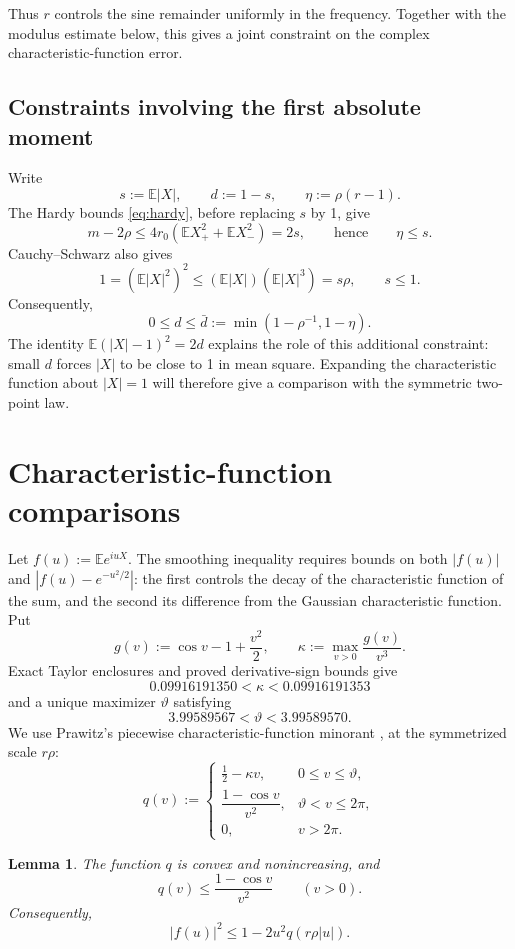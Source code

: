 \documentclass[11pt]{article}
\newtheorem{lemma}[theorem]{Lemma}
\newcommand{\E}{\mathbb E}
\newcommand{\abs}[1]{\lvert#1\rvert}
\begin{document}
Thus \(r\) controls the sine remainder uniformly in the frequency.  Together
with the modulus estimate below, this gives a joint constraint on the complex
characteristic-function error.

\subsection{Constraints involving the first absolute moment}\label{sec:radial-defect}

Write
\[
 s:=\E|X|,\qquad d:=1-s,\qquad \eta:=\rho(r-1).
\]
The Hardy bounds \eqref{eq:hardy}, before replacing \(s\) by 1, give
\[
 m-2\rho\le4r_0(\E X_+^2+\E X_-^2)=2s,
 \qquad\text{hence}\qquad \eta\le s.
\]
Cauchy--Schwarz also gives
\[
 1=(\E|X|^2)^2\le(\E|X|)(\E|X|^3)=s\rho,\qquad s\le1.
\]
Consequently,
\[
 0\le d\le\bar d:=\min(1-\rho^{-1},1-\eta).
 \label{eq:defect}\tag{2.6}
\]
The identity \(\E(|X|-1)^2=2d\) explains the role of this additional
constraint: small \(d\) forces \(|X|\) to be close to 1 in mean square.
Expanding the characteristic function about \(|X|=1\) will therefore
give a comparison with the symmetric two-point law.

\section{Characteristic-function comparisons}\label{sec:cf-bounds}

Let \(f(u):=\E e^{iuX}\). The smoothing inequality requires bounds on
both \(|f(u)|\) and \(|f(u)-e^{-u^2/2}|\): the first controls the
decay of the characteristic function of the sum, and the second its
difference from the Gaussian characteristic function. Put
\[
 g(v):=\cos v-1+\frac{v^2}{2},\qquad
 \kappa:=\max_{v>0}\frac{g(v)}{v^3}.
\]
Exact Taylor enclosures and proved derivative-sign bounds give
\[
 0.09916191350<\kappa<0.09916191353
\]
and a unique maximizer \(\vartheta\) satisfying
\[
 3.99589567<\vartheta<3.99589570.
\]
We use Prawitz's piecewise characteristic-function minorant
\cite{prawitz1975cf}, at the symmetrized scale \(r\rho\):
\[
 q(v):=
 \begin{cases}
 \frac12-\kappa v,&0\le v\le\vartheta,\\[1mm]
 \dfrac{1-\cos v}{v^2},&\vartheta<v\le2\pi,\\[2mm]
 0,&v>2\pi.
 \end{cases}
 \label{eq:q-def}\tag{3.1}
\]

\begin{lemma}\label{lem:q}
The function \(q\) is convex and nonincreasing, and
\[
 q(v)\le\frac{1-\cos v}{v^2}\qquad(v>0).
\]
Consequently,
\[
 \abs{f(u)}^2\le1-2u^2q(r\rho\abs u).
 \label{eq:modulus}\tag{3.2}
\]
\end{lemma}
\end{document}
